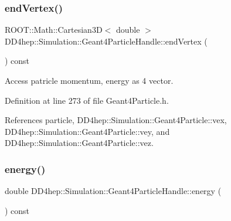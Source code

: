 \hypertarget{class_d_d4hep_1_1_simulation_1_1_geant4_particle_handle_a8ac91f3ece72e2f3ff5a5dc0c992d1dc}{}\label{class_d_d4hep_1_1_simulation_1_1_geant4_particle_handle_a8ac91f3ece72e2f3ff5a5dc0c992d1dc} 
\subsubsection{\texorpdfstring{end\+Vertex()}{endVertex()}}
{\footnotesize\ttfamily R\+O\+O\+T\+::\+Math\+::\+Cartesian3D$<$ double $>$ D\+D4hep\+::\+Simulation\+::\+Geant4\+Particle\+Handle\+::end\+Vertex (\begin{DoxyParamCaption}{ }\end{DoxyParamCaption}) const\hspace{0.3cm}{\ttfamily [inline]}}



Access patricle momentum, energy as 4 vector. 



Definition at line 273 of file Geant4\+Particle.\+h.



References particle, D\+D4hep\+::\+Simulation\+::\+Geant4\+Particle\+::vex, D\+D4hep\+::\+Simulation\+::\+Geant4\+Particle\+::vey, and D\+D4hep\+::\+Simulation\+::\+Geant4\+Particle\+::vez.

\hypertarget{class_d_d4hep_1_1_simulation_1_1_geant4_particle_handle_abe54a7ad661da4984b80bb681d442f57}{}\label{class_d_d4hep_1_1_simulation_1_1_geant4_particle_handle_abe54a7ad661da4984b80bb681d442f57} 
\subsubsection{\texorpdfstring{energy()}{energy()}}
{\footnotesize\ttfamily double D\+D4hep\+::\+Simulation\+::\+Geant4\+Particle\+Handle\+::energy (\begin{DoxyParamCaption}{ }\end{DoxyParamCaption}) const\hspace{0.3cm}{\ttfamily [inline]}}



